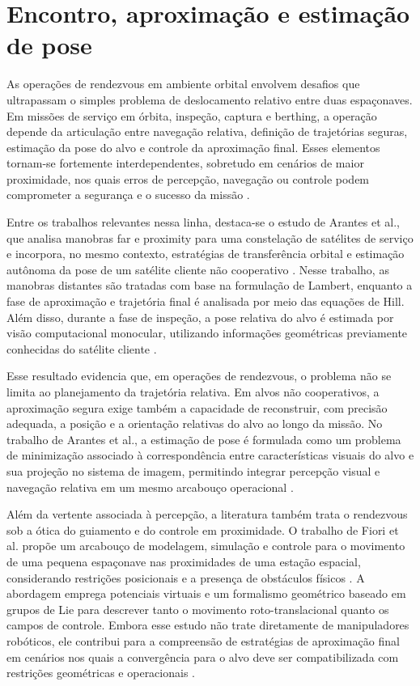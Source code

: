 \section{Encontro, aproximação e estimação de pose}

As operações de rendezvous em ambiente orbital envolvem desafios que ultrapassam o simples problema de deslocamento relativo entre duas espaçonaves. Em missões de serviço em órbita, inspeção, captura e berthing, a operação depende da articulação entre navegação relativa, definição de trajetórias seguras, estimação da pose do alvo e controle da aproximação final. Esses elementos tornam-se fortemente interdependentes, sobretudo em cenários de maior proximidade, nos quais erros de percepção, navegação ou controle podem comprometer a segurança e o sucesso da missão \cite{arantes2010far,fiori2024modeling}.

Entre os trabalhos relevantes nessa linha, destaca-se o estudo de Arantes et al., que analisa manobras far e proximity para uma constelação de satélites de serviço e incorpora, no mesmo contexto, estratégias de transferência orbital e estimação autônoma da pose de um satélite cliente não cooperativo \cite{arantes2010far}. Nesse trabalho, as manobras distantes são tratadas com base na formulação de Lambert, enquanto a fase de aproximação e trajetória final é analisada por meio das equações de Hill. Além disso, durante a fase de inspeção, a pose relativa do alvo é estimada por visão computacional monocular, utilizando informações geométricas previamente conhecidas do satélite cliente \cite{arantes2010far}.

Esse resultado evidencia que, em operações de rendezvous, o problema não se limita ao planejamento da trajetória relativa. Em alvos não cooperativos, a aproximação segura exige também a capacidade de reconstruir, com precisão adequada, a posição e a orientação relativas do alvo ao longo da missão. No trabalho de Arantes et al., a estimação de pose é formulada como um problema de minimização associado à correspondência entre características visuais do alvo e sua projeção no sistema de imagem, permitindo integrar percepção visual e navegação relativa em um mesmo arcabouço operacional \cite{arantes2010far}.

Além da vertente associada à percepção, a literatura também trata o rendezvous sob a ótica do guiamento e do controle em proximidade. O trabalho de Fiori et al. propõe um arcabouço de modelagem, simulação e controle para o movimento de uma pequena espaçonave nas proximidades de uma estação espacial, considerando restrições posicionais e a presença de obstáculos físicos \cite{fiori2024modeling}. A abordagem emprega potenciais virtuais e um formalismo geométrico baseado em grupos de Lie para descrever tanto o movimento roto-translacional quanto os campos de controle. Embora esse estudo não trate diretamente de manipuladores robóticos, ele contribui para a compreensão de estratégias de aproximação final em cenários nos quais a convergência para o alvo deve ser compatibilizada com restrições geométricas e operacionais \cite{fiori2024modeling}.

